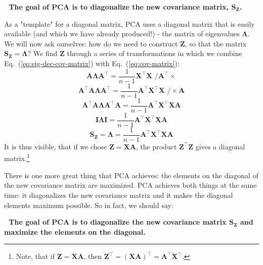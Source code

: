 \documentclass[10pt,twocolumn]{article}
\begin{document}
\,\,
\textbf{The goal of PCA is to diagonalize the new covariance matrix, $\mathbf{S_Z}$.}
\,\,

As a "template" for a diagonal matrix, PCA uses a diagonal matrix that is easily available (and which we have already produced!) - the matrix of eigenvalues $\mathbf{\Lambda}$. We will now ask ourselves: how do we need to construct $\mathbf{Z}$, so that the matrix $\mathbf{S_Z} = \mathbf{\Lambda}$?
We find $\mathbf{Z}$ through a series of transformations in which we combine Eq.~(\ref{eq:eig-dec-cov-matrix}) with Eq.~(\ref{eq:cov-matrix}):
\begin{equation}
\mathbf{A} \mathbf{\Lambda} \mathbf{A}^{\top} =  \frac{1}{n-1} \mathbf{X}^{\top} \mathbf{X} \,\, \Big/ \mathbf{A}^{\top} \times
\end{equation}
\begin{equation}
\mathbf{A}^{\top} \mathbf{A} \mathbf{\Lambda} \mathbf{A}^{\top} =  \frac{1}{n-1} \mathbf{A}^{\top}  \mathbf{X}^{\top} \mathbf{X} \,\, \Big/ \times \mathbf{A}
\end{equation}
\begin{equation}
\mathbf{A}^{\top} \mathbf{A} \mathbf{\Lambda} \mathbf{A}^{\top} \mathbf{A} =  \frac{1}{n-1} \mathbf{A}^{\top}  \mathbf{X}^{\top} \mathbf{X} \mathbf{A}
\end{equation}
\begin{equation}
\mathbf{I} \mathbf{\Lambda} \mathbf{I} =  \frac{1}{n-1} \mathbf{A}^{\top}  \mathbf{X}^{\top} \mathbf{X} \mathbf{A}
\end{equation}
\begin{equation}
\mathbf{S_Z}  = \mathbf{\Lambda} = \frac{1}{n-1} \mathbf{A}^{\top}  \mathbf{X}^{\top} \mathbf{X} \mathbf{A}
\end{equation}
It is thus visible, that if we chose $\mathbf{Z} = \mathbf{X} \mathbf{A}$, the product $\mathbf{Z}^{\top} \mathbf{Z}$ gives a diagonal matrix.\footnote{Note, that if $\mathbf{Z} = \mathbf{X} \mathbf{A}$, then $\mathbf{Z}^{\top} = (\mathbf{X} \mathbf{A})^{\top} = \mathbf{A}^{\top} \mathbf{X}^{\top}$.}

There is one more great thing that PCA achieves: the elements on the diagonal of the new covariance matrix are maximized. PCA achieves both things at the same time: it diagonalizes the new covariance matrix and it makes the diagonal elements maximum possible. So in fact, we should say:

\,\,
\textbf{The goal of PCA is to diagonalize the new covariance matrix $\mathbf{S_Z}$ and maximize the elements on the diagonal.}
\,\,
\end{document}
